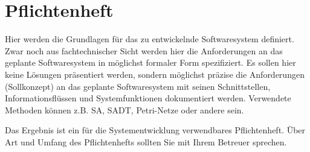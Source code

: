 
\chapter{Pflichtenheft} %

\label{ch:Pflichtenheft} %

Hier werden die Grundlagen für das zu entwickelnde Softwaresystem definiert.
Zwar noch aus fachtechnischer Sicht werden hier die Anforderungen an das
geplante Softwaresystem in möglichst formaler Form spezifiziert. Es sollen hier
keine Lösungen präsentiert werden, sondern möglichst präzise die Anforderungen
(Sollkonzept) an das geplante Softwaresystem mit seinen Schnittstellen,
Informationsflüssen und Systemfunktionen dokumentiert werden. Verwendete
Methoden können z.B. SA, SADT, Petri-Netze oder andere sein.

Das Ergebnis ist ein für die Systementwicklung verwendbares Pflichtenheft. Über
Art und Umfang des Pflichtenhefts sollten Sie mit Ihrem Betreuer sprechen.
